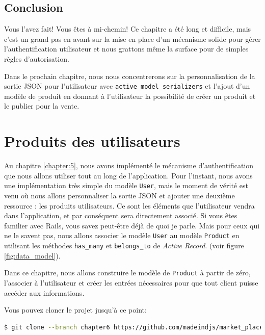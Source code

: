 \documentclass[]{report}
\begin{document}
  \section{Conclusion}

    Vous l'avez fait! Vous êtes à mi-chemin! Ce chapitre a été long et difficile, mais c'est un grand pas en avant sur la mise en place d'un mécanisme solide pour gérer l'authentification utilisateur et nous grattons même la surface pour de simples règles d'autorisation.

    Dans le prochain chapitre, nous nous concentrerons sur la personnalisation de la sortie JSON pour l'utilisateur avec \verb|active_model_serializers| et l'ajout d'un modèle de produit en donnant à l'utilisateur la possibilité de créer un produit et le publier pour la vente.

\chapter{Produits des utilisateurs}\label{chapter:6}

  Au chapitre \ref{chapter:5}, nous avons implémenté le mécanisme d'authentification que nous allons utiliser tout au long de l'application. Pour l'instant, nous avons une implémentation très simple du modèle \verb|User|, mais le moment de vérité est venu où nous allons personnaliser la sortie JSON et ajouter une deuxième ressource : les produits utilisateurs. Ce sont les éléments que l'utilisateur vendra dans l'application, et par conséquent sera directement associé. Si vous êtes familier avec Rails, vous savez peut-être déjà de quoi je parle. Mais pour ceux qui ne le savent pas, nous allons associer le modèle \verb|User| au modèle \verb|Product| en utilisant les méthodes \verb|has_many| et \verb|belongs_to| de \textit{Active Record}.  (voir figure \ref{fig:data_model}).

  Dans ce chapitre, nous allons construire le modèle de \verb|Product| à partir de zéro, l'associer à l'utilisateur et créer les entrées nécessaires pour que tout client puisse accéder aux informations.

  Vous pouvez cloner le projet jusqu'à ce point:

  \begin{scriptsize}
    \begin{lstlisting}[language=bash]
    $ git clone --branch chapter6 https://github.com/madeindjs/market_place_api
    \end{lstlisting}
  \end{scriptsize}
\end{document}
